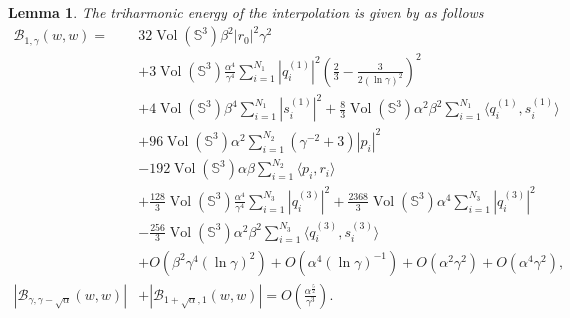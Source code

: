 \documentclass[11pt,letterpaper]{amsart}
\DeclareMathOperator{\Vol}{Vol}
\newcommand{\mB}{\mathcal{B}}
\newcommand{\bS}{\mathbb{S}}
\newtheorem{lemma}[theorem]{Lemma}
\theoremstyle{definition}
\theoremstyle{remark}
\numberwithin{equation}{section}
\begin{document}
\begin{lemma}\label{triharmonic-energy}
The triharmonic energy of the interpolation is given by as follows
    \begin{equation*}
        \begin{split}
            \mB_{1, \gamma}(w,w)=&32\Vol(\bS^3)\beta^2|r_0|^2\gamma^2\\            
            &+3\Vol(\bS^3)\frac{\alpha^4}{\gamma^4}\sum_{i=1}^{N_1}|q^{(1)}_i|^2\left(\frac{2}{3}-\frac{3}{2(\ln \gamma)^2}\right)^2\\
    &+4\Vol(\bS^3)\beta^4\sum_{i=1}^{N_1}|s^{(1)}_i|^2+\frac{8}{3}\Vol(\bS^3)\alpha^2\beta^2 \sum_{i=1}^{N_1}\langle q^{(1)}_i, s^{(1)}_i\rangle \\
&+96\Vol(\bS^3) \alpha^2\sum_{i=1}^{N_2}\left(\gamma^{-2}+3\right)|p_i|^2\\
   &-192\Vol(\bS^3)\alpha\beta\sum_{i=1}^{N_2} \langle p_i, r_i\rangle\\
    &+\frac{128}{3}\Vol(\bS^3)\frac{\alpha^4}{\gamma^4}\sum_{i=1}^{N_3}|q^{(3)}_i|^2+\frac{2368}{3}\Vol(\bS^3)\alpha^4\sum_{i=1}^{N_3}|q^{(3)}_i|^2\\
&-\frac{256}{3}\Vol(\bS^3)\alpha^2\beta^2\sum_{i=1}^{N_3}\langle q^{(3)}_i, s^{(3)}_i\rangle\\
&+O(\beta^2\gamma^4(\ln \gamma)^2)+O(\alpha^4(\ln \gamma)^{-1})+O(\alpha^2 \gamma^2)+O(\alpha^4\gamma^2),\\
            |\mB_{\gamma, \gamma-\sqrt{\alpha}}(w,w)|&+|\mB_{1+\sqrt{\alpha}, 1}(w,w)|=O\left(\frac{\alpha^{\frac{5}{2}}}{\gamma^3}\right).
        \end{split}
    \end{equation*}
\end{lemma}
\end{document}
